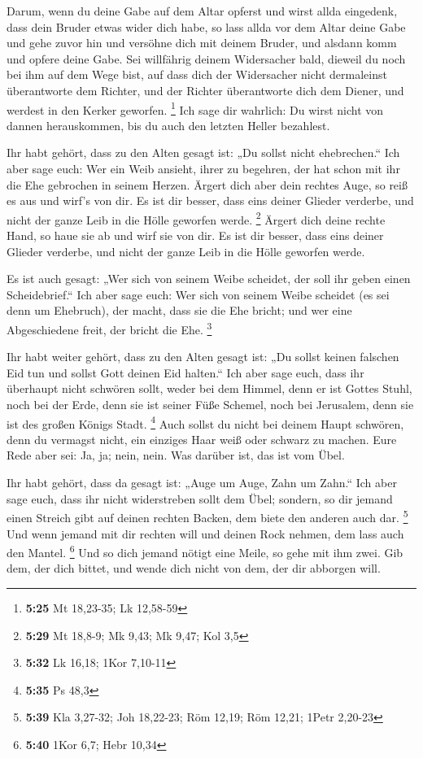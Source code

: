  Darum, wenn du deine Gabe auf dem Altar opferst und wirst
allda eingedenk, dass dein Bruder etwas wider dich habe, 
so lass allda vor dem Altar deine Gabe und gehe zuvor hin und versöhne
dich mit deinem Bruder, und alsdann komm und opfere deine Gabe.
 Sei willfährig deinem Widersacher bald, dieweil du noch
bei ihm auf dem Wege bist, auf dass dich der Widersacher nicht
dermaleinst überantworte dem Richter, und der Richter überantworte dich
dem Diener, und werdest in den Kerker geworfen. \footnote{\textbf{5:25}
  Mt 18,23-35; Lk 12,58-59}  Ich sage dir wahrlich: Du
wirst nicht von dannen herauskommen, bis du auch den letzten Heller
bezahlest.

 Ihr habt gehört, dass zu den Alten gesagt ist: „Du sollst
nicht ehebrechen.``  Ich aber sage euch: Wer ein Weib
ansieht, ihrer zu begehren, der hat schon mit ihr die Ehe gebrochen in
seinem Herzen.  Ärgert dich aber dein rechtes Auge, so reiß
es aus und wirf's von dir. Es ist dir besser, dass eins deiner Glieder
verderbe, und nicht der ganze Leib in die Hölle geworfen werde.
\footnote{\textbf{5:29} Mt 18,8-9; Mk 9,43; Mk 9,47; Kol 3,5}
 Ärgert dich deine rechte Hand, so haue sie ab und wirf sie
von dir. Es ist dir besser, dass eins deiner Glieder verderbe, und nicht
der ganze Leib in die Hölle geworfen werde.

 Es ist auch gesagt: „Wer sich von seinem Weibe scheidet,
der soll ihr geben einen Scheidebrief.``  Ich aber sage
euch: Wer sich von seinem Weibe scheidet (es sei denn um Ehebruch), der
macht, dass sie die Ehe bricht; und wer eine Abgeschiedene freit, der
bricht die Ehe. \footnote{\textbf{5:32} Lk 16,18; 1Kor 7,10-11}

 Ihr habt weiter gehört, dass zu den Alten gesagt ist: „Du
sollst keinen falschen Eid tun und sollst Gott deinen Eid halten.``
 Ich aber sage euch, dass ihr überhaupt nicht schwören
sollt, weder bei dem Himmel, denn er ist Gottes Stuhl, 
noch bei der Erde, denn sie ist seiner Füße Schemel, noch bei Jerusalem,
denn sie ist des großen Königs Stadt. \footnote{\textbf{5:35} Ps 48,3}
 Auch sollst du nicht bei deinem Haupt schwören, denn du
vermagst nicht, ein einziges Haar weiß oder schwarz zu machen.
 Eure Rede aber sei: Ja, ja; nein, nein. Was darüber ist,
das ist vom Übel.

 Ihr habt gehört, dass da gesagt ist: „Auge um Auge, Zahn
um Zahn.``  Ich aber sage euch, dass ihr nicht widerstreben
sollt dem Übel; sondern, so dir jemand einen Streich gibt auf deinen
rechten Backen, dem biete den anderen auch dar. \footnote{\textbf{5:39}
  Kla 3,27-32; Joh 18,22-23; Röm 12,19; Röm 12,21; 1Petr 2,20-23}
 Und wenn jemand mit dir rechten will und deinen Rock
nehmen, dem lass auch den Mantel. \footnote{\textbf{5:40} 1Kor 6,7; Hebr
  10,34}  Und so dich jemand nötigt eine Meile, so gehe mit
ihm zwei.  Gib dem, der dich bittet, und wende dich nicht
von dem, der dir abborgen will.

